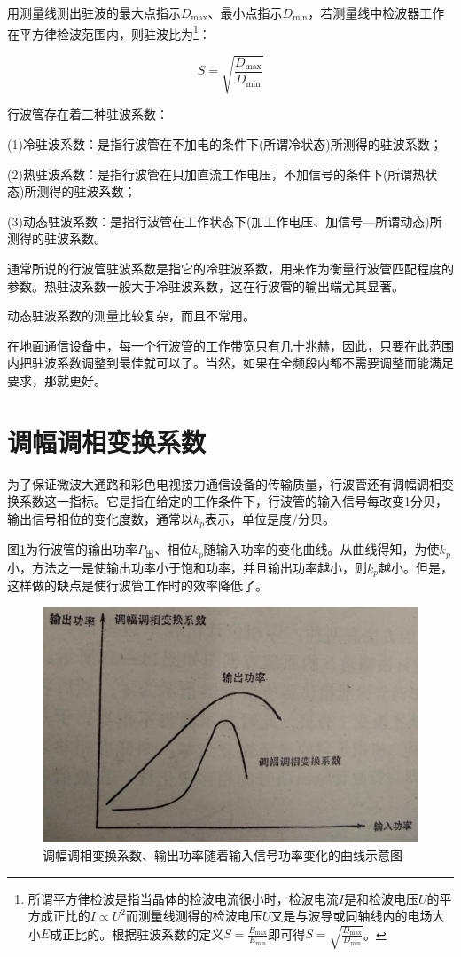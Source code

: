 用测量线测出驻波的最大点指示$ D_{\textrm{max}} $、最小点指示$ D_{\textrm{min}}$，若测量线中检波器工作在平方律检波范围内，则驻波比为\footnote{所谓平方律检波是指当晶体的检波电流很小时，检波电流$ I $是和检波电压$ U $的平方成正比的$ I\propto U^2 $而测量线测得的检波电压$ U $又是与波导或同轴线内的电场大小$ E$成正比的。根据驻波系数的定义$ S = \frac{E_{\textrm{max}}}{E_\textrm{min}} $即可得$ S=\sqrt{\frac{D_\textrm{max}}{D_\textrm{min}}} $。}：

\begin{equation} \label{eq:11-14}
	S = \sqrt{\frac{D_\textrm{max}}{D_\textrm{min}}}
\end{equation}

行波管存在着三种驻波系数：

(1)冷驻波系数：是指行波管在不加电的条件下(所谓冷状态)所测得的驻波系数；


(2)热驻波系数：是指行波管在只加直流工作电压，不加信号的条件下(所谓热状态)所测得的驻波系数；


(3)动态驻波系数：是指行波管在工作状态下(加工作电压、加信号—所谓动态)所测得的驻波系数。


通常所说的行波管驻波系数是指它的冷驻波系数，用来作为衡量行波管匹配程度的参数。热驻波系数一般大于冷驻波系数，这在行波管的输出端尤其显著。


动态驻波系数的测量比较复杂，而且不常用。


在地面通信设备中，每一个行波管的工作带宽只有几十兆赫，因此，只要在此范围内把驻波系数调整到最佳就可以了。当然，如果在全频段内都不需要调整而能满足要求，那就更好。

\section{调幅调相变换系数}
为了保证微波大通路和彩色电视接力通信设备的传输质量，行波管还有调幅调相变换系数这一指标。它是指在给定的工作条件下，行波管的输入信号每改变1分贝，输出信号相位的变化度数，通常以$k_p $表示，单位是度/分贝。


图\ref{ch11-13}为行波管的输出功率$ P_\textrm{出} $、相位$ k_p $随输入功率的变化曲线。从曲线得知，为使$ k_p $小，方法之一是使输出功率小于饱和功率，并且输出功率越小，则$ k_p $越小。但是，这样做的缺点是使行波管工作时的效率降低了。

\begin{figure}[phtb]
	\centering
	\includegraphics[width=0.6\linewidth]{figure/ch11-13}
	\caption{调幅调相变换系数、输出功率随着输入信号功率变化的曲线示意图}
	\label{ch11-13}
\end{figure}


